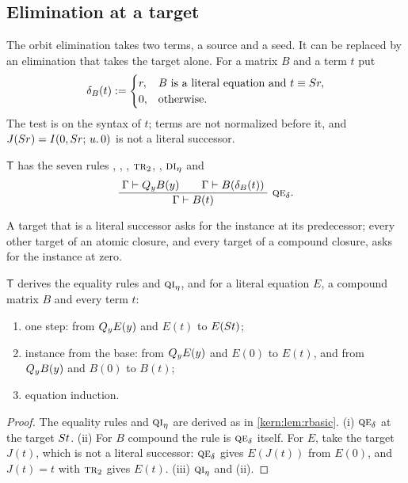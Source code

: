 \subsection{Elimination at a target}
\label{kern:sec:target}

The orbit elimination takes two terms, a source and a seed.  It can be
replaced by an elimination that takes the target alone.  For a matrix $B$
and a term $t$ put
\[
 \delta_B(t)\mathrel{:=}
 \begin{cases}
  r, & B\text{ is a literal equation and }t\equiv S r,\\
  0, & \text{otherwise.}
 \end{cases}
\]
The test is on the syntax of $t$; terms are not normalized before it, and
$J(S r)=I(0,S r;\,u.\,0)$ is not a literal successor.

\begin{definition}
\label{kern:def:T}
$\mathsf{T}$ has the seven rules , ,
, $\rulename{Tr}_{2}$, , $\rulename{DI}_{\eta}$ and
\[
 \infrule{\Gamma\proves\Q{y}B(y)\qquad\Gamma\proves B(\delta_B(t))}
         {\Gamma\proves B(t)}\ \rulename{QE}_{\delta}.
\]
\end{definition}

A target that is a literal successor asks for the instance at its
predecessor; every other target of an atomic closure, and every target of a
compound closure, asks for the instance at zero.

\begin{lemma}
\label{kern:lem:tbasic}
$\mathsf{T}$ derives the equality rules and $\rulename{QI}_{\eta}$, and for a
literal equation $E$, a compound matrix $B$ and every term $t$:
\begin{enumerate}[label=\textup{(\roman*)}]
\item one step: from $Q_{y}E(y)$ and $E(t)$ to $E(S t)$;
\item instance from the base: from $Q_{y}E(y)$ and $E(0)$ to $E(t)$, and
 from $Q_{y}B(y)$ and $B(0)$ to $B(t)$;
\item equation induction.
\end{enumerate}
\end{lemma}

\begin{proof}
The equality rules and $\rulename{QI}_{\eta}$ are derived as in
\cref{kern:lem:rbasic}.  (i) $\rulename{QE}_{\delta}$ at the target
$S t$.  (ii) For $B$ compound the rule is $\rulename{QE}_{\delta}$
itself.  For $E$, take the target $J(t)$, which is not a literal successor:
$\rulename{QE}_{\delta}$ gives $E(J(t))$ from $E(0)$, and $J(t)=t$ with
$\rulename{Tr}_{2}$ gives $E(t)$.  (iii) $\rulename{QI}_{\eta}$ and (ii).
\end{proof}

